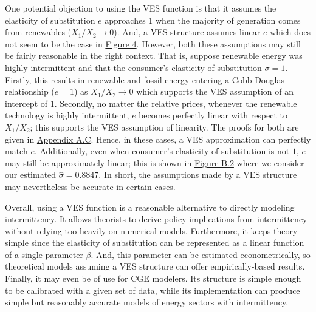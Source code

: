 \documentclass[11pt,a4paper]{extarticle}
\begin{document}
One potential objection to using the VES function is that it assumes the elasticity of substitution $e$ approaches 1 when the majority of generation comes from renewables ($X_1/X_2 \to 0$). And, a VES structure assumes linear $e$ which does not seem to be the case in \hyperref[fig:ves]{Figure 4}. However, both these assumptions may still be fairly reasonable in the right context. That is, suppose renewable energy was highly intermittent and that the consumer's elasticity of substitution $\sigma = 1$. Firstly, this results in renewable  and fossil energy entering a Cobb-Douglas relationship ($e = 1$) as $X_1/X_2 \to 0$ which supports the VES assumption of an intercept of 1. Secondly, no matter the relative prices, whenever the renewable technology is highly intermittent, $e$ becomes perfectly linear with respect to $X_1/X_2$; this supports the VES assumption of linearity. The proofs for both are given in \hyperref[sec:asympeos]{Appendix A.C}. Hence, in these cases, a VES approximation  can perfectly match $e$. Additionally, even when consumer's elasticity of substitution is not $1$, $e$ may still be approximately linear; this is shown in \hyperref[fig:ves_int]{Figure B.2} where we consider our estimated $\hat{\sigma} = 0.8847$. In short, the assumptions made by a VES structure may nevertheless be accurate in certain cases. 



Overall, using a VES function is a reasonable alternative to directly modeling intermittency. It allows theorists to derive policy implications from intermittency without relying too heavily on numerical models. Furthermore, it keeps theory simple since the elasticity of substitution can be represented as a linear function of a single parameter $\beta$. And, this parameter can be estimated econometrically, so theoretical models assuming a VES structure can offer empirically-based results. Finally, it may even be of use for CGE modelers. Its structure is simple enough to be calibrated with a given set of data, while its implementation can produce simple but reasonably accurate models of energy sectors with intermittency. 
\end{document}
